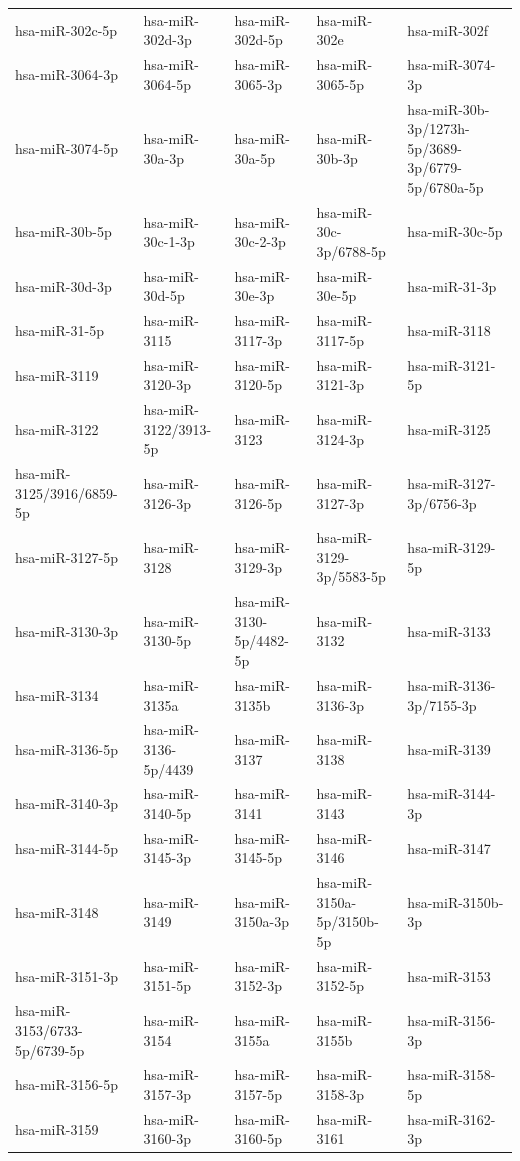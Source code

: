 \begin{longtable}{lllll}
hsa-miR-302c-5p & hsa-miR-302d-3p & hsa-miR-302d-5p & hsa-miR-302e & hsa-miR-302f \\
hsa-miR-3064-3p & hsa-miR-3064-5p & hsa-miR-3065-3p & hsa-miR-3065-5p & hsa-miR-3074-3p \\
hsa-miR-3074-5p & hsa-miR-30a-3p & hsa-miR-30a-5p & hsa-miR-30b-3p & hsa-miR-30b-3p/1273h-5p/3689-3p/6779-5p/6780a-5p \\
hsa-miR-30b-5p & hsa-miR-30c-1-3p & hsa-miR-30c-2-3p & hsa-miR-30c-3p/6788-5p & hsa-miR-30c-5p \\
hsa-miR-30d-3p & hsa-miR-30d-5p & hsa-miR-30e-3p & hsa-miR-30e-5p & hsa-miR-31-3p \\
hsa-miR-31-5p & hsa-miR-3115 & hsa-miR-3117-3p & hsa-miR-3117-5p & hsa-miR-3118 \\
hsa-miR-3119 & hsa-miR-3120-3p & hsa-miR-3120-5p & hsa-miR-3121-3p & hsa-miR-3121-5p \\
hsa-miR-3122 & hsa-miR-3122/3913-5p & hsa-miR-3123 & hsa-miR-3124-3p & hsa-miR-3125 \\
hsa-miR-3125/3916/6859-5p & hsa-miR-3126-3p & hsa-miR-3126-5p & hsa-miR-3127-3p & hsa-miR-3127-3p/6756-3p \\
hsa-miR-3127-5p & hsa-miR-3128 & hsa-miR-3129-3p & hsa-miR-3129-3p/5583-5p & hsa-miR-3129-5p \\
hsa-miR-3130-3p & hsa-miR-3130-5p & hsa-miR-3130-5p/4482-5p & hsa-miR-3132 & hsa-miR-3133 \\
hsa-miR-3134 & hsa-miR-3135a & hsa-miR-3135b & hsa-miR-3136-3p & hsa-miR-3136-3p/7155-3p \\
hsa-miR-3136-5p & hsa-miR-3136-5p/4439 & hsa-miR-3137 & hsa-miR-3138 & hsa-miR-3139 \\
hsa-miR-3140-3p & hsa-miR-3140-5p & hsa-miR-3141 & hsa-miR-3143 & hsa-miR-3144-3p \\
hsa-miR-3144-5p & hsa-miR-3145-3p & hsa-miR-3145-5p & hsa-miR-3146 & hsa-miR-3147 \\
hsa-miR-3148 & hsa-miR-3149 & hsa-miR-3150a-3p & hsa-miR-3150a-5p/3150b-5p & hsa-miR-3150b-3p \\
hsa-miR-3151-3p & hsa-miR-3151-5p & hsa-miR-3152-3p & hsa-miR-3152-5p & hsa-miR-3153 \\
hsa-miR-3153/6733-5p/6739-5p & hsa-miR-3154 & hsa-miR-3155a & hsa-miR-3155b & hsa-miR-3156-3p \\
hsa-miR-3156-5p & hsa-miR-3157-3p & hsa-miR-3157-5p & hsa-miR-3158-3p & hsa-miR-3158-5p \\
hsa-miR-3159 & hsa-miR-3160-3p & hsa-miR-3160-5p & hsa-miR-3161 & hsa-miR-3162-3p \\

\end{longtable}
